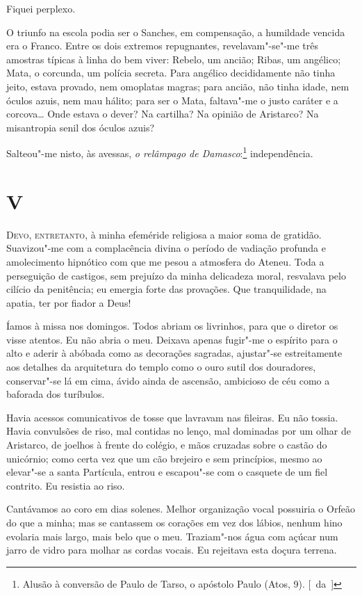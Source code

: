 Fiquei perplexo. 

O triunfo na escola podia ser o Sanches, em
compensação, a humildade vencida era o Franco. Entre os dois extremos
repugnantes, revelavam"-se"-me três amostras típicas à linha do bem
viver: Rebelo, um ancião; Ribas, um angélico; Mata, o corcunda, um
polícia secreta. Para angélico decididamente não tinha jeito, estava
provado, nem omoplatas magras; para ancião, não tinha idade, nem óculos
azuis, nem mau hálito; para ser o Mata, faltava"-me o justo caráter e
a corcova\ldots{} Onde estava o dever? Na cartilha? Na opinião de Aristarco?
Na misantropia senil dos óculos azuis? 

Salteou"-me nisto, às avessas,
\textit{o relâmpago de Damasco}:\footnote{ Alusão à conversão de Paulo de Tarso, 
o apóstolo Paulo (Atos, 9). \mbox{[~da ]}} independência. 

\section{V}

\noindent\textsc{Devo, entretanto}, à minha efeméride religiosa a maior soma de gratidão.
Suavizou"-me com a complacência divina o período de vadiação profunda
e amolecimento hipnótico com que me pesou a atmosfera do Ateneu. Toda a
perseguição de castigos, sem prejuízo da minha delicadeza
moral, resvalava pelo cilício da penitência; eu emergia forte das provações.
Que tranquilidade, na apatia, ter por fiador a Deus! 

Íamos à missa nos domingos. Todos abriam os livrinhos, para que o diretor os visse
atentos. Eu não abria o meu. Deixava apenas fugir"-me o espírito para
o alto e aderir à abóbada como as decorações sagradas, ajustar"-se
estreitamente aos detalhes da arquitetura do templo como o ouro sutil
dos douradores, conservar"-se lá em cima, ávido ainda de ascensão,
ambicioso de céu como a baforada dos turíbulos. 

Havia acessos comunicativos de tosse que lavravam nas fileiras. Eu não tossia. 
Havia convulsões de riso, mal contidas no lenço, mal dominadas por um olhar
de Aristarco, de joelhos à frente do colégio, e mãos cruzadas sobre o
castão do unicórnio; como certa vez que um cão brejeiro e sem
princípios, mesmo ao elevar"-se a santa Partícula, entrou e
escapou"-se com o casquete de um fiel contrito. Eu resistia ao riso.

Cantávamos ao coro em dias solenes. Melhor organização vocal possuiria
o Orfeão do que a minha; mas se cantassem os corações em vez dos
lábios, nenhum hino evolaria mais largo, mais belo que o meu.
Traziam"-nos água com açúcar num jarro de vidro para molhar as cordas
vocais. Eu rejeitava esta doçura terrena. 

